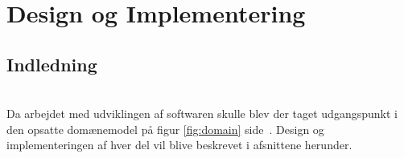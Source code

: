 \section{Design og Implementering}

\subsection{Indledning} \\

Da arbejdet med udviklingen af softwaren skulle blev der taget udgangspunkt i den opsatte domænemodel på figur \ref{fig:domain} side~\pageref{fig:domain}. Design og implementeringen af hver del vil blive beskrevet i afsnittene herunder.




